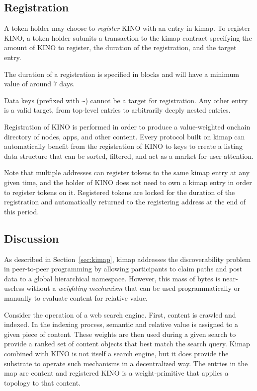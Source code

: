 \documentclass[runningheads]{llncs}
\begin{document}
\subsection{Registration}
\label{sec:kinoregister}

A token holder may choose to \textit{register} KINO with an entry in kimap.
To register KINO, a token holder submits a transaction to the kimap contract specifying the amount of KINO to register, the duration of the registration, and the target entry.

The duration of a registration is specified in blocks and will have a minimum value of around 7 days.

Data keys (prefixed with \verb|~|) cannot be a target for registration.
Any other entry is a valid target, from top-level entries to arbitrarily deeply nested entries.

Registration of KINO is performed in order to produce a value-weighted onchain directory of nodes, apps, and other content.
Every protocol built on kimap can automatically benefit from the registration of KINO to keys to create a listing data structure that can be sorted, filtered, and act as a market for user attention.

Note that multiple addresses can register tokens to the same kimap entry at any given time, and the holder of KINO does not need to own a kimap entry in order to register tokens on it.
Registered tokens are locked for the duration of the registration and automatically returned to the registering address at the end of this period.

\subsection{Discussion}
\label{sec:kinodiscussion}

As described in Section~\ref{sec:kimap}, kimap addresses the discoverability problem in peer-to-peer programming by allowing participants to claim paths and post data to a global hierarchical namespace.
However, this mass of bytes is near-useless without a \textit{weighting mechanism} that can be used programmatically or manually to evaluate content for relative value.

Consider the operation of a web search engine.
First, content is crawled and indexed.
In the indexing process, semantic and relative value is assigned to a given piece of content.
These weights are then used during a given search to provide a ranked set of content objects that best match the search query.
Kimap combined with KINO is not itself a search engine, but it does provide the substrate to operate such mechanisms in a decentralized way.
The entries in the map are content and registered KINO is a weight-primitive that applies a topology to that content.
\end{document}

